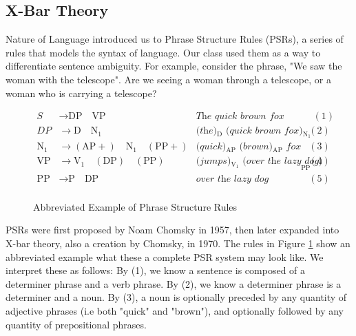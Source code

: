 \documentclass[runningheads]{llncs}
\begin{document}
\subsection{X-Bar Theory}
Nature of Language introduced us to Phrase Structure Rules (PSRs), a series of rules that models the syntax of language. Our class used them as a way to differentiate sentence ambiguity. %
For example, consider the phrase, "We saw the woman with the telescope". Are we seeing a woman through a telescope, or a woman who is carrying a telescope?

\begin{figure}
    \[
			\begin{array}{rlrr}
				S  &\rightarrow \text{DP} \quad \text{VP}&\textit{The quick brown fox jumps over the lazy dog} &\ \ (1) \\
			DP  &\rightarrow \text{D} \quad \text{N}_1&\textit{(the)$_\text{D}$ (quick brown fox)$_{\text{N}_1}$} & (2) \\
				\text{N}_1 &\rightarrow (\text{AP}+) \quad \text{N}_1 \quad (\text{PP}+)&\textit{(quick)$_\text{AP}$ (brown)$_\text{AP}$ fox} & (3)\\
				\text{VP} &\rightarrow \text{V}_1 \quad (\text{DP}) \quad (\text{PP})&\textit{(jumps)$_{\text{V}_1}$ (over the lazy dog)}_{\text{PP}} & (4)\\
				\text{PP} &\rightarrow \text{P} \quad \text{DP}&\textit{over the lazy dog} & (5)\\
    \end{array}
	\]
    \caption{Abbreviated Example of Phrase Structure Rules}
		\label{fig:psr}
\end{figure}
PSRs were first proposed by Noam Chomsky in 1957, then later expanded into X-bar theory, also a creation by Chomsky, in 1970. %
The rules in Figure \ref{fig:psr} show an abbreviated example what these a complete PSR system may look like. We interpret these as follows: By (1), we know a sentence is composed of a determiner phrase and a verb phrase. By (2), we know a determiner phrase is a determiner and a noun. By (3), a noun is optionally preceded by any quantity of adjective phrases (i.e both "quick" and "brown"), and optionally followed by any quantity of prepositional phrases.
\end{document}
